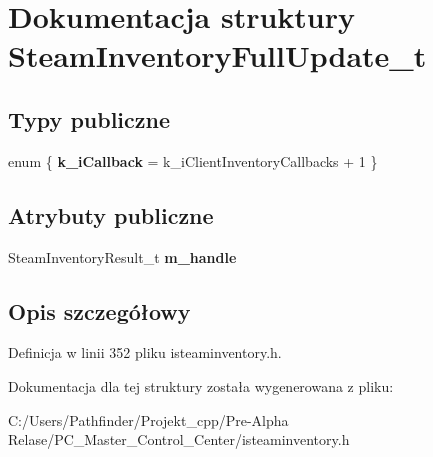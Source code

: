 \hypertarget{struct_steam_inventory_full_update__t}{}\section{Dokumentacja struktury Steam\+Inventory\+Full\+Update\+\_\+t}
\label{struct_steam_inventory_full_update__t}
\subsection*{Typy publiczne}
\begin{DoxyCompactItemize}
\item 
\mbox{\label{struct_steam_inventory_full_update__t_ab27b7dde9364a52598914ac8a55136d7}} 
enum \{ {\bfseries k\+\_\+i\+Callback} = k\+\_\+i\+Client\+Inventory\+Callbacks + 1
 \}
\end{DoxyCompactItemize}
\subsection*{Atrybuty publiczne}
\begin{DoxyCompactItemize}
\item 
\mbox{\label{struct_steam_inventory_full_update__t_a2864555021de3bf6e254536adfc0748a}} 
Steam\+Inventory\+Result\+\_\+t {\bfseries m\+\_\+handle}
\end{DoxyCompactItemize}


\subsection{Opis szczegółowy}


Definicja w linii 352 pliku isteaminventory.\+h.



Dokumentacja dla tej struktury została wygenerowana z pliku\+:\begin{DoxyCompactItemize}
\item 
C\+:/\+Users/\+Pathfinder/\+Projekt\+\_\+cpp/\+Pre-\/\+Alpha Relase/\+P\+C\+\_\+\+Master\+\_\+\+Control\+\_\+\+Center/isteaminventory.\+h\end{DoxyCompactItemize}
